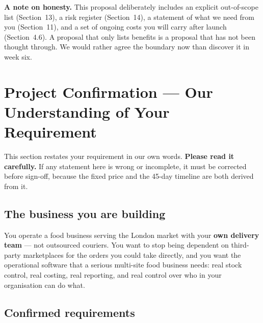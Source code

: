 \documentclass[11pt,a4paper]{article}
\begin{document}
\begin{keybox}
\textbf{A note on honesty.} This proposal deliberately includes an explicit
out-of-scope list (Section~13), a risk register (Section~14), a statement of what
we need from you (Section~11), and a set of ongoing costs you will carry after launch
(Section~4.6). A proposal that only lists benefits is a proposal that has not been
thought through. We would rather agree the boundary now than discover it in week six.
\end{keybox}

\clearpage

\section{Project Confirmation --- Our Understanding of Your Requirement}

This section restates your requirement in our own words. \textbf{Please read it
carefully.} If any statement here is wrong or incomplete, it must be corrected before
sign-off, because the fixed price and the 45-day timeline are both derived from it.

\subsection{The business you are building}

You operate a food business serving the London market with your \textbf{own delivery
team} --- not outsourced couriers. You want to stop being dependent on third-party
marketplaces for the orders you could take directly, and you want the operational
software that a serious multi-site food business needs: real stock control, real
costing, real reporting, and real control over who in your organisation can do what.

\subsection{Confirmed requirements}
\end{document}
